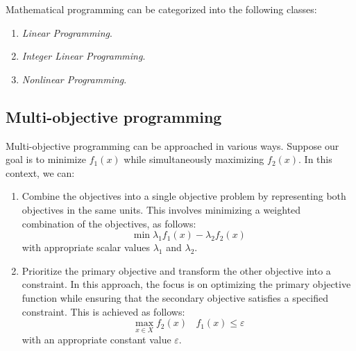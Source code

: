 Mathematical programming can be categorized into the following classes:
\begin{enumerate}
    \item \textit{Linear Programming}.
    \item \textit{Integer Linear Programming}.
    \item \textit{Nonlinear Programming}. 
\end{enumerate}

\subsection*{Multi-objective programming}
Multi-objective programming can be approached in various ways. 
Suppose our goal is to minimize $f_1(x)$ while simultaneously maximizing $f_2(x)$. 
In this context, we can:
\begin{enumerate}
    \item Combine the objectives into a single objective problem by representing both objectives in the same units. 
        This involves minimizing a weighted combination of the objectives, as follows:
        \[\min{\lambda_1f_1(x)-\lambda_2f_2(x)}\]
        with appropriate scalar values $\lambda_1$ and $\lambda_2$.
    \item Prioritize the primary objective and transform the other objective into a constraint. 
        In this approach, the focus is on optimizing the primary objective function while ensuring that the secondary objective satisfies a specified constraint. 
        This is achieved as follows:
        \[\max_{x \in X}f_2(x) \:\:\:\: f_1(x)\leq \varepsilon\]
        with an appropriate constant value $\varepsilon$. 
\end{enumerate}